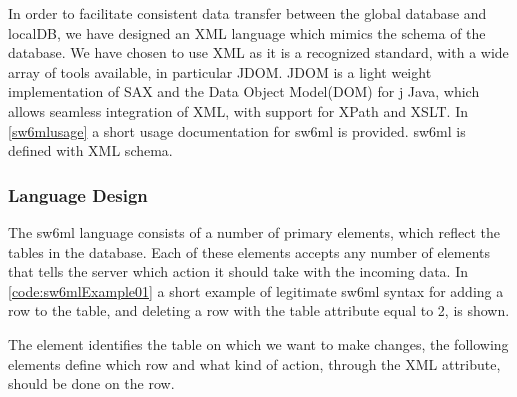 In order to facilitate consistent data transfer between the global database and localDB, we have designed an XML language which mimics
the schema of the database. We have chosen to use XML as it is a recognized standard, with a wide array of tools available, in particular JDOM\cite{www.jdom.org}.
JDOM is a light weight implementation of SAX and the Data Object Model(DOM) for j
Java, which allows seamless integration of XML, with support for XPath and XSLT.
In \autoref{sw6mlusage} a short usage documentation for sw6ml is provided. sw6ml is defined with XML schema.

\subsubsection{Language Design}

The sw6ml language consists of a number of primary elements, which reflect the tables in the database. Each of these elements accepts any number of  elements that tells
the server which action it should take with the incoming data.
In \autoref{code:sw6mlExample01} a short example of legitimate sw6ml syntax for adding a row to the  table, and deleting a row with the  table attribute equal to 2, is shown.

The  element identifies the table on which we want to make changes, the following  elements
define which row and what kind of action, through the  XML attribute, should be done on the row. 

